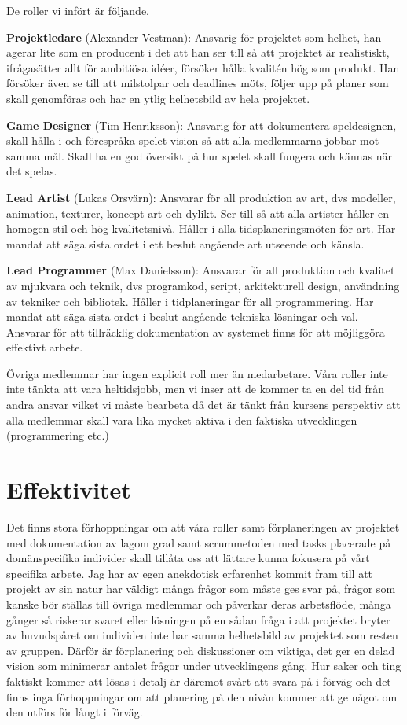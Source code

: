 \documentclass[a4paper]{report}
\begin{document}
De roller vi infört är följande.

\textbf{Projektledare} (Alexander Vestman): Ansvarig för projektet som helhet, han agerar lite som en
producent i det att han ser till så att projektet är realistiskt, ifrågasätter
allt för ambitiösa idéer, försöker hålla kvalitén hög som produkt. Han försöker
även se till att milstolpar och deadlines möts, följer upp på planer som skall
genomföras och har en ytlig helhetsbild av hela projektet.

\textbf{Game Designer} (Tim Henriksson): Ansvarig för att dokumentera speldesignen, skall hålla i och
förespråka spelet vision så att alla medlemmarna jobbar mot samma mål. Skall ha
en god översikt på hur spelet skall fungera och kännas när det spelas.

\textbf{Lead Artist} (Lukas Orsvärn): Ansvarar för all produktion av art, dvs modeller, animation,
texturer, koncept-art och dylikt. Ser till så att alla artister håller en
homogen stil och hög kvalitetsnivå. Håller i alla tidsplaneringsmöten för art.
Har mandat att säga sista ordet i ett beslut angående art utseende och känsla.

\textbf{Lead Programmer} (Max Danielsson): Ansvarar för all produktion och kvalitet av
mjukvara och teknik, dvs programkod, script, arkitekturell design, användning
av tekniker och bibliotek.  Håller i tidplaneringar för all programmering. Har
mandat att säga sista ordet i beslut angående tekniska lösningar och val.
Ansvarar för att tillräcklig dokumentation av systemet finns för att möjliggöra
effektivt arbete.

Övriga medlemmar har ingen explicit roll mer än medarbetare. Våra roller inte
inte tänkta att vara heltidsjobb, men vi inser att de kommer ta en del tid från
andra ansvar vilket vi måste bearbeta då det är tänkt från kursens perspektiv
att alla medlemmar skall vara lika mycket aktiva i den faktiska utvecklingen
(programmering etc.)

\section*{Effektivitet}

Det finns stora förhoppningar om att våra roller samt förplaneringen av
projektet med dokumentation av lagom grad samt scrummetoden med tasks placerade
på domänspecifika individer skall tillåta oss att lättare kunna fokusera på
vårt specifika arbete. Jag har av egen anekdotisk erfarenhet kommit fram till
att projekt av sin natur har väldigt många frågor som måste ges svar på, frågor
som kanske bör ställas till övriga medlemmar och påverkar deras arbetsflöde,
många gånger så riskerar svaret eller lösningen på en sådan fråga i att
projektet bryter av huvudspåret om individen inte har samma helhetsbild av
projektet som resten av gruppen. Därför är förplanering och diskussioner om
viktiga, det ger en delad vision som minimerar antalet frågor under
utvecklingens gång. Hur saker och ting faktiskt kommer att lösas i detalj är
däremot svårt att svara på i förväg och det finns inga förhoppningar om att
planering på den nivån kommer att ge något om den utförs för långt i förväg.
\end{document}
